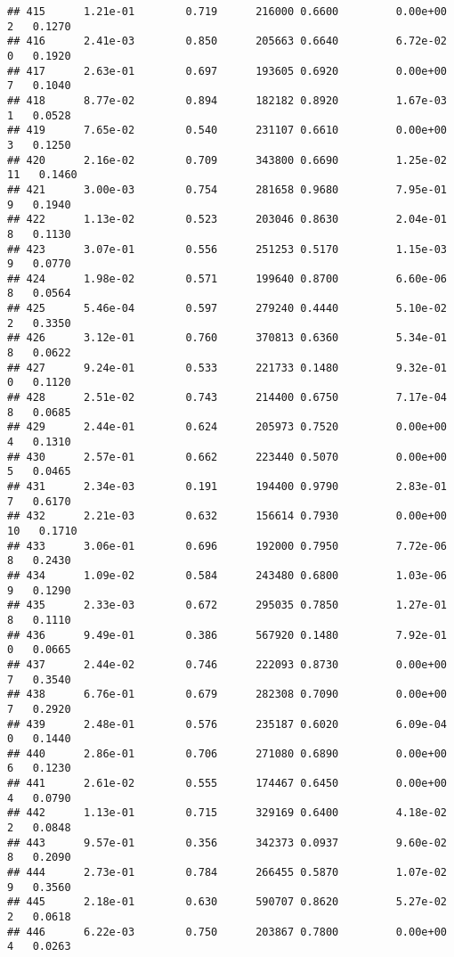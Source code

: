 \documentclass[
]{article}
\begin{document}
\begin{verbatim}
## 415      1.21e-01        0.719      216000 0.6600         0.00e+00   2   0.1270
## 416      2.41e-03        0.850      205663 0.6640         6.72e-02   0   0.1920
## 417      2.63e-01        0.697      193605 0.6920         0.00e+00   7   0.1040
## 418      8.77e-02        0.894      182182 0.8920         1.67e-03   1   0.0528
## 419      7.65e-02        0.540      231107 0.6610         0.00e+00   3   0.1250
## 420      2.16e-02        0.709      343800 0.6690         1.25e-02  11   0.1460
## 421      3.00e-03        0.754      281658 0.9680         7.95e-01   9   0.1940
## 422      1.13e-02        0.523      203046 0.8630         2.04e-01   8   0.1130
## 423      3.07e-01        0.556      251253 0.5170         1.15e-03   9   0.0770
## 424      1.98e-02        0.571      199640 0.8700         6.60e-06   8   0.0564
## 425      5.46e-04        0.597      279240 0.4440         5.10e-02   2   0.3350
## 426      3.12e-01        0.760      370813 0.6360         5.34e-01   8   0.0622
## 427      9.24e-01        0.533      221733 0.1480         9.32e-01   0   0.1120
## 428      2.51e-02        0.743      214400 0.6750         7.17e-04   8   0.0685
## 429      2.44e-01        0.624      205973 0.7520         0.00e+00   4   0.1310
## 430      2.57e-01        0.662      223440 0.5070         0.00e+00   5   0.0465
## 431      2.34e-03        0.191      194400 0.9790         2.83e-01   7   0.6170
## 432      2.21e-03        0.632      156614 0.7930         0.00e+00  10   0.1710
## 433      3.06e-01        0.696      192000 0.7950         7.72e-06   8   0.2430
## 434      1.09e-02        0.584      243480 0.6800         1.03e-06   9   0.1290
## 435      2.33e-03        0.672      295035 0.7850         1.27e-01   8   0.1110
## 436      9.49e-01        0.386      567920 0.1480         7.92e-01   0   0.0665
## 437      2.44e-02        0.746      222093 0.8730         0.00e+00   7   0.3540
## 438      6.76e-01        0.679      282308 0.7090         0.00e+00   7   0.2920
## 439      2.48e-01        0.576      235187 0.6020         6.09e-04   0   0.1440
## 440      2.86e-01        0.706      271080 0.6890         0.00e+00   6   0.1230
## 441      2.61e-02        0.555      174467 0.6450         0.00e+00   4   0.0790
## 442      1.13e-01        0.715      329169 0.6400         4.18e-02   2   0.0848
## 443      9.57e-01        0.356      342373 0.0937         9.60e-02   8   0.2090
## 444      2.73e-01        0.784      266455 0.5870         1.07e-02   9   0.3560
## 445      2.18e-01        0.630      590707 0.8620         5.27e-02   2   0.0618
## 446      6.22e-03        0.750      203867 0.7800         0.00e+00   4   0.0263

\end{verbatim}
\end{document}
